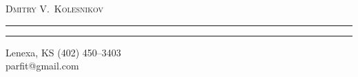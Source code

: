 \pagestyle{fancy}
\renewcommand{\headrulewidth}{0pt}
\setlength{\parindent}{0in}

\begin{center}
\begin{LARGE}
\textsc{Dmitry V.\ Kolesnikov}
\end{LARGE}
\end{center}
\vspace{-0.5mm}
\hrule
\vspace{0.3mm}
\hrule
\vspace{3mm}
\begin{small}\textnormal{Lenexa, KS} \hfill \textnormal{\Telefon\hspace{1mm}(402) 450--3403}\\ %
\null \hfill \textnormal{\Letter\hspace{0.8mm}parfit@gmail.com}\\\end{small}
\vspace{4mm}